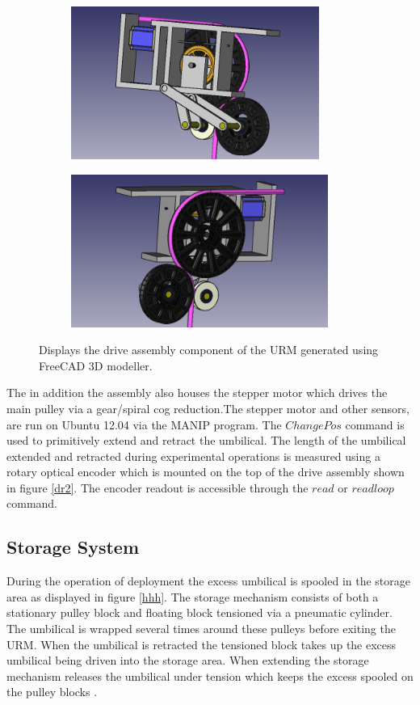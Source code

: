 \documentclass[paper=a4, fontsize=11pt]{scrartcl}
\numberwithin{equation}{section}		%
\numberwithin{figure}{section}			%
\numberwithin{table}{section}				%
\begin{document}
\begin{figure}[h]
        \centering
        \begin{subfigure}[h]{0.8\textwidth}
                \includegraphics[height = 5cm]{original1}
                \caption{}
				
        \end{subfigure}%
       \quad
        \begin{subfigure}[h]{0.8\textwidth}
                \includegraphics[height = 5cm]{original2}
                \caption{}
                
        \end{subfigure}
        \quad

        \caption{Displays the drive assembly component of the URM generated using FreeCAD 3D modeller.}
        \label{dr}
\end{figure}

The in addition the assembly also houses the stepper motor which drives the main pulley via a gear/spiral cog reduction.The stepper motor and other sensors, are run on Ubuntu 12.04 via the MANIP program. The $ChangePos$ command is used to primitively extend and retract the umbilical. The length of the umbilical extended and retracted during experimental operations is measured using a rotary optical encoder which is mounted on the top of the drive assembly shown in figure \ref{dr2}. The encoder readout is accessible through the $read$ or $readloop$ command. 

\subsection{Storage System}
During the operation of deployment the excess umbilical is spooled in the storage area as displayed in figure \ref{hhh}. The storage mechanism consists of both a stationary pulley block and floating block tensioned via a pneumatic cylinder. The umbilical is wrapped several times around these pulleys before exiting the URM. When the umbilical is retracted the tensioned block takes up the excess umbilical being driven into the storage area. When extending the storage mechanism releases the umbilical under tension which keeps the excess spooled on the pulley blocks \cite{p1}.
\end{document}
